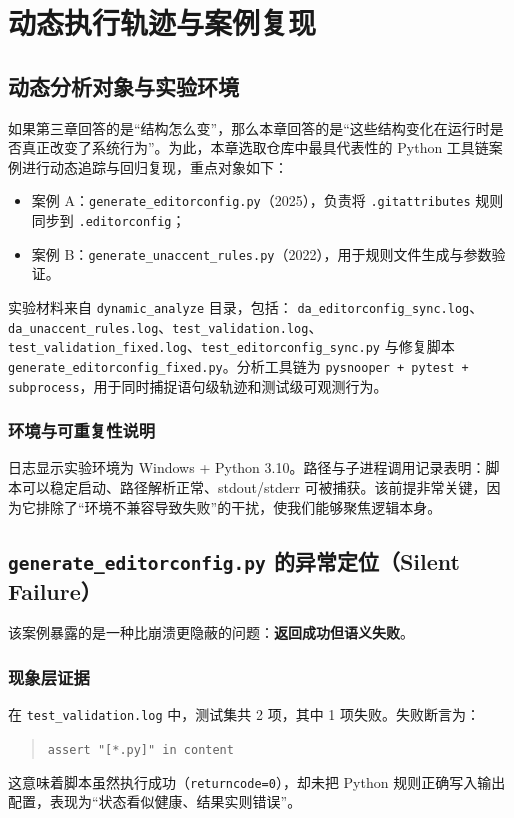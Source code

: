 \chapter{动态执行轨迹与案例复现}\label{chap:dynamic}

\section{动态分析对象与实验环境}
如果第三章回答的是“结构怎么变”，那么本章回答的是“这些结构变化在运行时是否真正改变了系统行为”。为此，本章选取仓库中最具代表性的 Python 工具链案例进行动态追踪与回归复现，重点对象如下：
\begin{itemize}
    \item 案例 A：\texttt{generate\_editorconfig.py}（2025），负责将 \texttt{.gitattributes} 规则同步到 \texttt{.editorconfig}；
    \item 案例 B：\texttt{generate\_unaccent\_rules.py}（2022），用于规则文件生成与参数验证。
\end{itemize}

实验材料来自 \texttt{dynamic\_analyze} 目录，包括：
\texttt{da\_editorconfig\_sync.log}、\texttt{da\_unaccent\_rules.log}、\texttt{test\_validation.log}、\texttt{test\_validation\_fixed.log}、\texttt{test\_editorconfig\_sync.py} 与修复脚本 \texttt{generate\_editorconfig\_fixed.py}。分析工具链为 \texttt{pysnooper + pytest + subprocess}，用于同时捕捉语句级轨迹和测试级可观测行为。

\subsection*{环境与可重复性说明}
日志显示实验环境为 Windows + Python 3.10。路径与子进程调用记录表明：脚本可以稳定启动、路径解析正常、stdout/stderr 可被捕获。该前提非常关键，因为它排除了“环境不兼容导致失败”的干扰，使我们能够聚焦逻辑本身。

\section{\texttt{generate\_editorconfig.py} 的异常定位（Silent Failure）}
该案例暴露的是一种比崩溃更隐蔽的问题：\textbf{返回成功但语义失败}。

\subsection*{现象层证据}
在 \texttt{test\_validation.log} 中，测试集共 2 项，其中 1 项失败。失败断言为：
\begin{quote}
\texttt{assert "[*.py]" in content}
\end{quote}
这意味着脚本虽然执行成功（\texttt{returncode=0}），却未把 Python 规则正确写入输出配置，表现为“状态看似健康、结果实则错误”。

